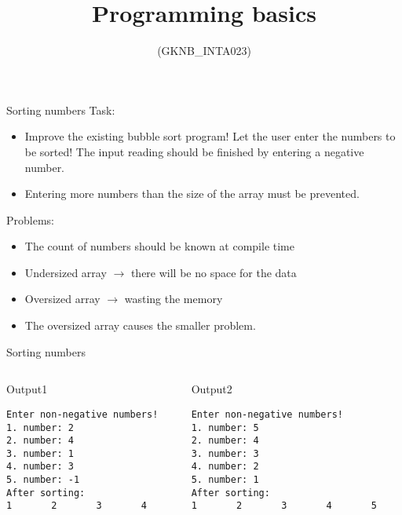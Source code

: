 \documentclass[usenames,dvipsnames,aspectratio=169]{beamer}
\title[Lecture 9.]{Programming basics}
\subtitle{(GKNB\_INTA023)}
\begin{document}
\begin{frame}[plain]
  \titlepage
\end{frame}

\begin{frame}{Sorting numbers}
  Task:
  \begin{itemize}
    \item Improve the existing bubble sort program! Let the user enter the numbers to be sorted! The input reading should be finished by entering a negative number.
    \item Entering more numbers than the size of the array must be prevented.
  \end{itemize}
  Problems:
  \begin{itemize}
    \item The count of numbers should be known at compile time
    \item Undersized array $\to$ there will be no space for the data
    \item Oversized array $\to$ wasting the memory
    \item The oversized array causes the smaller problem.
  \end{itemize}
\end{frame}

\begin{frame}[fragile]{Sorting numbers}
  \begin{columns}[T]
      \begin{block}{Output1}
        \small
        \begin{verbatim}
Enter non-negative numbers!
1. number: 2
2. number: 4
3. number: 1
4. number: 3
5. number: -1
After sorting:
1       2       3       4       
\end{verbatim}
      \end{block}
      \begin{block}{Output2}
        \small
        \begin{verbatim}
Enter non-negative numbers!
1. number: 5
2. number: 4
3. number: 3
4. number: 2
5. number: 1
After sorting:
1       2       3       4       5       
\end{verbatim}
      \end{block}
  \end{columns}
\end{frame}

%     
%     
\end{document}
